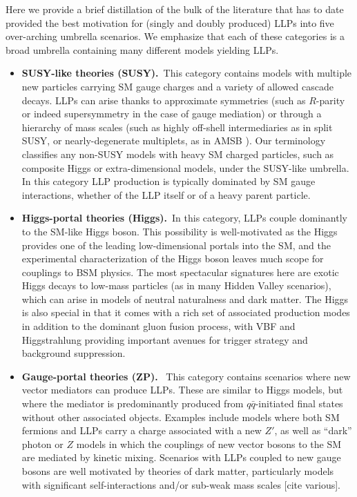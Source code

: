 Here we provide a brief distillation of the bulk of the literature that has to date provided the best motivation for (singly and doubly produced) LLPs into five over-arching umbrella scenarios.  We emphasize that each of these categories is a broad umbrella containing many different models yielding LLPs.
%
\begin{itemize}

\item {\bf SUSY-like theories (SUSY).}~This category contains models
  with multiple new particles carrying SM gauge charges and a variety
  of allowed cascade decays. LLPs can arise thanks to approximate
  symmetries (such as $R$-parity or indeed supersymmetry in the case
  of gauge mediation) or through a hierarchy of mass scales (such as
  highly off-shell intermediaries as in split SUSY, or
  nearly-degenerate multiplets, as in AMSB ).  Our terminology
  classifies any non-SUSY models with heavy SM charged particles, such
  as composite Higgs or extra-dimensional models, under the SUSY-like
  umbrella.  In this category LLP production is typically dominated by
  SM gauge interactions, whether of the LLP itself or of a heavy
  parent particle.

\item {\bf Higgs-portal theories (Higgs).}~In this category, LLPs couple dominantly to the SM-like Higgs boson.  This possibility is well-motivated as the Higgs provides one of the leading low-dimensional portals into the SM, and the experimental characterization of the Higgs boson leaves much scope for couplings to BSM physics.  The most spectacular signatures here are exotic Higgs decays to low-mass particles  (as in many Hidden Valley scenarios), which can arise in models of neutral naturalness and dark matter.  
The Higgs is also special in that it comes with a rich set of associated production modes in addition to the dominant gluon fusion process, with VBF and Higgstrahlung providing important avenues for trigger strategy and background suppression.

\item {\bf Gauge-portal theories (ZP).}~ This category contains scenarios where new vector mediators can produce LLPs. These are similar to Higgs models, but where the mediator is predominantly produced from $q\bar{q}$-initiated final states without other associated objects. Examples include models where both SM fermions and LLPs carry a charge associated with a new $Z'$, as well as ``dark'' photon or $Z$ models in which the couplings of new vector bosons to the SM are mediated by kinetic mixing. Scenarios with LLPs coupled to new gauge bosons are well motivated by theories of dark matter, particularly models with significant self-interactions and/or sub-weak mass scales [cite various].


\end{itemize}

